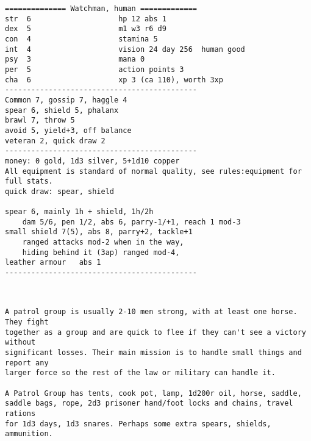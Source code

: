 \goodbreak \begin{samepage} \small \begin{verbatim}
============== Watchman, human =============
str  6                    hp 12 abs 1
dex  5                    m1 w3 r6 d9
con  4                    stamina 5
int  4                    vision 24 day 256  human good
psy  3                    mana 0
per  5                    action points 3
cha  6                    xp 3 (ca 110), worth 3xp
--------------------------------------------
Common 7, gossip 7, haggle 4
spear 6, shield 5, phalanx
brawl 7, throw 5
avoid 5, yield+3, off balance
veteran 2, quick draw 2
--------------------------------------------
money: 0 gold, 1d3 silver, 5+1d10 copper
All equipment is standard of normal quality, see rules:equipment for full stats.
quick draw: spear, shield

spear 6, mainly 1h + shield, 1h/2h
    dam 5/6, pen 1/2, abs 6, parry-1/+1, reach 1 mod-3
small shield 7(5), abs 8, parry+2, tackle+1
    ranged attacks mod-2 when in the way,
    hiding behind it (3ap) ranged mod-4,
leather armour   abs 1
--------------------------------------------
\end{verbatim} \normalsize \end{samepage}

\

\goodbreak \begin{samepage} \small \begin{verbatim}
A patrol group is usually 2-10 men strong, with at least one horse. They fight
together as a group and are quick to flee if they can't see a victory without
significant losses. Their main mission is to handle small things and report any
larger force so the rest of the law or military can handle it.

A Patrol Group has tents, cook pot, lamp, 1d200r oil, horse, saddle,
saddle bags, rope, 2d3 prisoner hand/foot locks and chains, travel rations
for 1d3 days, 1d3 snares. Perhaps some extra spears, shields, ammunition.
\end{verbatim} \normalsize \end{samepage}

\

